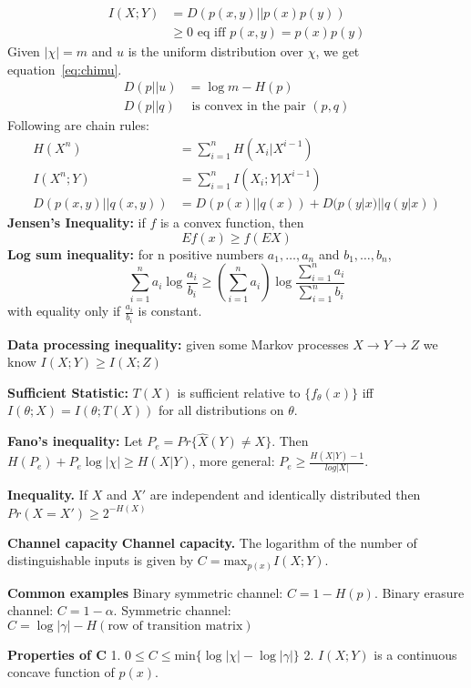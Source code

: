 \documentclass[10pt]{article}
\begin{document}
\begin{tiny}
\begin{multicols}{3}
\begin{align}
I(X;Y)&=D(p(x,y)||p(x)p(y))\\
	&\geq 0 \text{ eq iff $p(x,y)=p(x)p(y)$}
\end{align}
Given $|\chi|=m$ and $u$ is the uniform distribution over $\chi$, we get equation~\ref{eq:chimu}.
\begin{align}
D(p||u)&=\log m - H(p)\label{eq:chimu}\\
D(p||q)&\text{ is convex in the pair }(p,q)
\end{align}
Following are chain rules:
\begin{align}
H(X^n)&=\sum_{i=1}^n H(X_i|X^{i-1})\\
I(X^n;Y)&=\sum_{i=1}^n I(X_i;Y|X^{i-1})\\
D(p(x,y)||q(x,y))&=D(p(x)||q(x)) + D(p(y|x)||q(y|x))
\end{align}
{\bf Jensen's Inequality:} if $f$ is a convex function, then
\begin{equation}
Ef(x) \geq f(EX)
\end{equation}
{\bf Log sum inequality:} for n positive numbers $a_1,\ldots,a_n$ and $b_1,\ldots,b_n$,
\begin{equation}
\sum_{i=1}^n a_i \log \frac{a_i}{b_i} \geq \left( \sum_{i=1}^n a_i \right) \log \frac{\sum_{i=1}^n a_i}{\sum_{i=1}^n b_i}
\end{equation}
with equality only if $\frac{a_i}{b_i}$ is constant. 

{\bf Data processing inequality:} given some Markov processes $X\rightarrow Y\rightarrow Z$ we know $I(X;Y)\geq I(X;Z)$

{\bf Sufficient Statistic:} $T(X)$ is sufficient relative to $\{f_\theta (x)\}$ iff $I(\theta;X)=I(\theta;T(X))$ for all distributions on $\theta$.

{\bf Fano's inequality:} Let $P_e=Pr\{\hat{X}(Y)\neq X\}$. Then $H(P_e)+P_e \log |\chi| \geq H(X|Y)$, more general: $P_e \geq \frac{H(X|Y)-1}{log|X|}$.

{\bf Inequality.} If $X$ and $X'$ are independent and identically distributed then $Pr(X=X') \geq 2^{-H(X)}$


\textbf{\scriptsize Channel capacity}
{\bf Channel capacity.} The logarithm of the number of distinguishable inputs is given by $ C= \text{max}_{p(x)} I(X;Y).$

{\bf Common examples} Binary symmetric channel: $C= 1 - H(p)$. Binary erasure channel: $C = 1 - \alpha$. Symmetric channel: $C= \log |\gamma | - H(\text{row of transition matrix})$

{\bf Properties of C}  1. $0 \leq C \leq \text{min}\{\log |\chi| - \log | \gamma | \}$  2. $I(X;Y)$ is a continuous concave function of $p(x)$.


\end{multicols}
\end{tiny}
\end{document}
